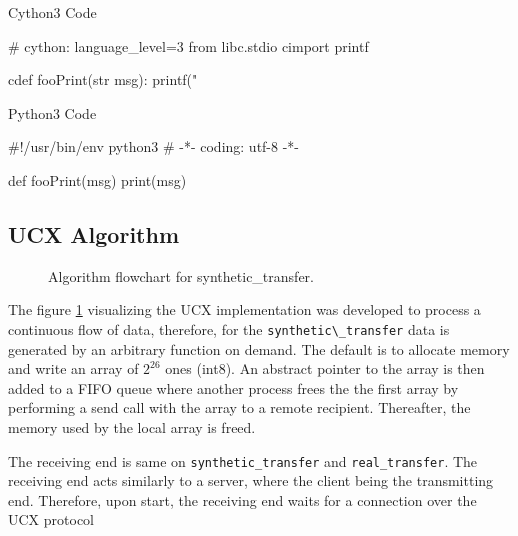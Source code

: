 \documentclass[a4paper,onecolumn]{article}
\begin{document}
\noindent\begin{minipage}{.45\textwidth}
Cython3 Code
\begin{python}
# cython: language_level=3
from libc.stdio cimport printf

cdef fooPrint(str msg):
    printf("%
\end{python}

\end{minipage}\hfill
\begin{minipage}{.45\textwidth}
Python3 Code
\begin{python}
#!/usr/bin/env python3
# -*- coding: utf-8 -*-

def fooPrint(msg)
    print(msg)
\end{python}

\end{minipage}

\subsection{UCX Algorithm}

\begin{figure}[H]
\begin{center}
\caption{Algorithm flowchart for synthetic\_transfer.}
\label{high-level-ucx}
\end{center}
\end{figure}

The figure \ref{high-level-ucx} visualizing the UCX implementation was developed to process a continuous flow of data, therefore, for the \verb|synthetic\_transfer| data is generated by an arbitrary function on demand. The default is to allocate memory and write an array of $2^{26}$ ones (int8). An abstract pointer to the array is then added to a FIFO queue where another process frees the the first array by performing a send call with the array to a remote recipient. Thereafter, the memory used by the local array is freed. 

The receiving end is same on \verb|synthetic_transfer| and \verb|real_transfer|. The receiving end acts similarly to a server, where the client being the transmitting end.
Therefore, upon start, the receiving end waits for a connection over the UCX protocol
\end{document}

